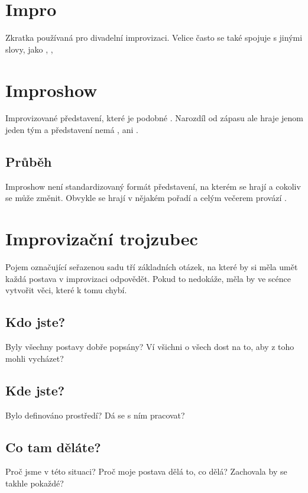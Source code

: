 \documentclass[main.tex]{subfiles}
\begin{document}
 
\needspace{5cm} \section{Impro} \label{impro} Zkratka používaná pro divadelní improvizaci. Velice často se také spojuje s jinými slovy, jako , ,  
 
 
\needspace{5cm} \section{Improshow} \label{improshow} Improvizované představení, které je podobné . Narozdíl od zápasu ale hraje jenom jeden tým a představení nemá , ani . 
 
\subsection{ Průběh } Improshow není standardizovaný formát představení, na kterém se hrají  a cokoliv se může změnit. Obvykle se hrají  v nějakém pořadí a celým večerem provází . 
 
 
 
 
 
\needspace{5cm} \section{Improvizační trojzubec} \label{improvizační trojzubec} Pojem označující seřazenou sadu tří základních otázek, na které by si měla umět každá postava v improvizaci odpovědět. Pokud to nedokáže, měla by ve scénce vytvořit věci, které k tomu chybí. 
 
\subsection{ Kdo jste? } Byly všechny postavy dobře popsány? Ví všichni o všech dost na to, aby z toho mohli vycházet? 
 
\subsection{ Kde jste? } Bylo definováno prostředí? Dá se s ním pracovat? 
 
\subsection{ Co tam děláte? } Proč jsme v této situaci? Proč moje postava dělá to, co dělá? Zachovala by se takhle pokaždé? 
 
\end{document}
